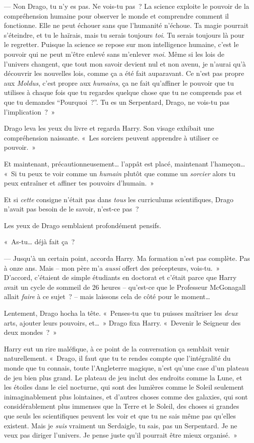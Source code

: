 --- Non Drago, tu n'y es pas. Ne vois-tu pas~? La science exploite le pouvoir de la compréhension humaine pour observer le monde et comprendre comment il fonctionne. Elle ne peut échouer sans que l'humanité n'échoue. Ta magie pourrait s'éteindre, et tu le haïrais, mais tu serais toujours \emph{toi}. Tu serais toujours là pour le regretter. Puisque la science se repose sur mon intelligence humaine, c'est le pouvoir qui ne peut m'être enlevé sans m'enlever \emph{moi}. Même si les lois de l'univers changent, que tout mon savoir devient nul et non avenu, je n'aurai qu'à découvrir les nouvelles lois, comme ça a été fait auparavant. Ce n'est pas propre aux \emph{Moldus}, c'est propre aux \emph{humains}, ça ne fait qu'affiner le pouvoir que tu utilises à chaque fois que tu regardes quelque chose que tu ne comprends pas et que tu demandes “Pourquoi~?”. Tu es un Serpentard, Drago, ne vois-tu pas l'implication~?~»

Drago leva les yeux du livre et regarda Harry. Son visage exhibait une compréhension naissante. «~Les sorciers peuvent apprendre à utiliser ce pouvoir.~»

Et maintenant, précautionneusement… l'appât est placé, maintenant l'hameçon… «~Si tu peux te voir comme un \emph{humain} plutôt que comme un \emph{sorcier} alors tu peux entraîner et affiner tes pouvoirs d'humain.~»

Et si \emph{cette} consigne n'était pas dans \emph{tous} les curriculums scientifiques, Drago n'avait pas besoin de le savoir, n'est-ce pas~?

Les yeux de Drago semblaient profondément pensifs.

«~As-tu… déjà fait ça~?

--- Jusqu'à un certain point, accorda Harry. Ma formation n'est pas complète. Pas à onze ans. Mais -- mon père m'a \emph{aussi} offert des précepteurs, vois-tu.~» D'accord, c'étaient de simple étudiants en doctorat et c'était parce que Harry avait un cycle de sommeil de 26 heures -- qu'est-ce que le Professeur McGonagall allait \emph{faire} à ce sujet~? -- mais laissons cela de côté pour le moment…

Lentement, Drago hocha la tête. «~Penses-tu que tu puisses maîtriser les \emph{deux} arts, ajouter leurs pouvoirs, et…~» Drago fixa Harry. «~Devenir le Seigneur des deux mondes~?~»

Harry eut un rire maléfique, à ce point de la conversation ça semblait venir naturellement. «~Drago, il faut que tu te rendes compte que l'intégralité du monde que tu connais, toute l'Angleterre magique, n'est qu'une case d'un plateau de jeu bien plus grand. Le plateau de jeu inclut des endroits comme la Lune, et les étoiles dans le ciel nocturne, qui sont des lumières comme le Soleil seulement inimaginablement plus lointaines, et d'autres choses comme des galaxies, qui sont considérablement plus immenses que la Terre et le Soleil, des choses si grandes que seuls les scientifiques peuvent les voir et que tu ne sais même pas qu'elles existent. Mais je \emph{suis} vraiment un Serdaigle, tu sais, pas un Serpentard. Je ne veux pas diriger l'univers. Je pense juste qu'il pourrait être mieux organisé.~»

